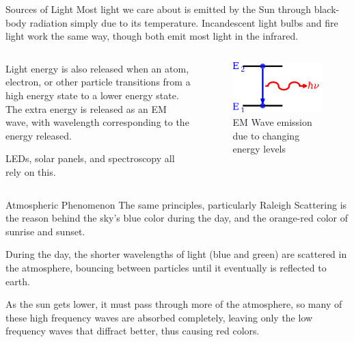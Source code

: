 \documentclass{beamer}
\begin{document}
\begin{frame}{Sources of Light}
    Most light we care about is emitted by the Sun through black-body radiation simply due to its temperature. Incandescent light bulbs and fire light work the same way, though both emit most light in the infrared. 
    \vspace{2mm}
    
\begin{columns}
    \begin{column}{.5\textwidth}
    Light energy is also released when an atom, electron, or other particle transitions from a high energy state to a lower energy state. The extra energy is released as an EM wave, with wavelength corresponding to the energy released. 
    
    \vspace{2mm}
    
    LEDs, solar panels, and spectroscopy all rely on this.
    
    \end{column}
    \begin{column}{.5\textwidth}
    \begin{figure}
        \centering
        \includegraphics[scale=.1]{emission.png}
        \caption{EM Wave emission due to changing energy levels}
        \label{fig:infrared}
    \end{figure}
    \end{column}
\end{columns}
\end{frame}

\begin{frame}{Atmospheric Phenomenon}
    The same principles, particularly \alert{Raleigh Scattering} is the reason behind the sky's blue color during the day, and the orange-red color of sunrise and sunset. \newline
    
    During the day, the shorter wavelengths of light (blue and green) are \alert{scattered} in the atmosphere, bouncing between particles until it eventually is reflected to earth. \newline
    
    As the sun gets lower, it must pass through more of the atmosphere, so many of these high frequency waves are absorbed completely, leaving only the low frequency waves that diffract better, thus causing red colors. 
\end{frame}
\end{document}
